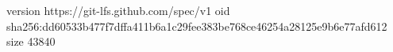 version https://git-lfs.github.com/spec/v1
oid sha256:dd60533b477f7dffa411b6a1c29fee383be768ce46254a28125e9b6e77afd612
size 43840
